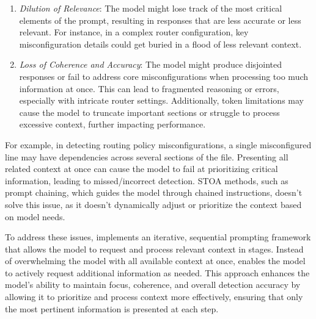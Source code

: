 \begin{enumerate}
    \item \textit{Dilution of Relevance}: The model might lose track of the most critical elements of the prompt, resulting in responses that are less accurate or less relevant. For instance, in a complex router configuration, key misconfiguration details could get buried in a flood of less relevant context.
    \item \textit{Loss of Coherence and Accuracy}:
    The model might produce disjointed responses or fail to address core
    misconfigurations when processing too much information at once. This
    can lead to fragmented reasoning or errors, especially with intricate
    router settings. Additionally, token limitations may cause the model
    to truncate important sections or struggle to process excessive context, 
    further impacting performance.
\end{enumerate}

For example, in detecting routing policy misconfigurations, a single misconfigured line may have dependencies across several sections of the file. Presenting all related context at once can cause the model to fail at prioritizing critical information, leading to missed/incorrect detection. STOA methods, such as prompt chaining, which guides the model through chained instructions, doesn't solve this issue, as it doesn't dynamically adjust or prioritize the context based on model needs.


To address these issues, \sysname{} implements an iterative, sequential prompting framework that allows the model to request and process relevant context in stages. Instead of overwhelming the model with all available context at once, \sysname{} enables the model to actively request additional information as needed. This approach enhances the model’s ability to maintain focus, coherence, and overall detection accuracy by allowing it to prioritize and process context more effectively, ensuring that only the most pertinent information is presented at each step.


